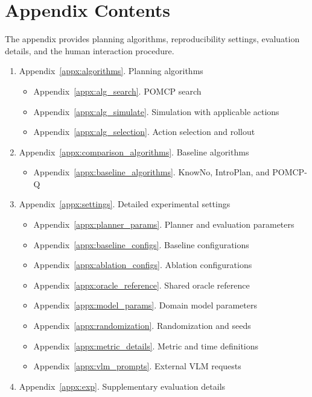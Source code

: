 \onecolumn
\setcounter{secnumdepth}{3}
\section*{Appendix Contents}
The appendix provides planning algorithms, reproducibility settings, evaluation details, and the human interaction procedure.

\begin{enumerate}
  \item Appendix~\ref{appx:algorithms}. Planning algorithms
  \begin{itemize}
    \item Appendix~\ref{appx:alg_search}. POMCP search
    \item Appendix~\ref{appx:alg_simulate}. Simulation with applicable actions
    \item Appendix~\ref{appx:alg_selection}. Action selection and rollout
  \end{itemize}
  \item Appendix~\ref{appx:comparison_algorithms}. Baseline algorithms
  \begin{itemize}
    \item Appendix~\ref{appx:baseline_algorithms}. KnowNo, IntroPlan, and POMCP-Q
  \end{itemize}
  \item Appendix~\ref{appx:settings}. Detailed experimental settings
  \begin{itemize}
    \item Appendix~\ref{appx:planner_params}. Planner and evaluation parameters
    \item Appendix~\ref{appx:baseline_configs}. Baseline configurations
    \item Appendix~\ref{appx:ablation_configs}. Ablation configurations
    \item Appendix~\ref{appx:oracle_reference}. Shared oracle reference
    \item Appendix~\ref{appx:model_params}. Domain model parameters
    \item Appendix~\ref{appx:randomization}. Randomization and seeds
    \item Appendix~\ref{appx:metric_details}. Metric and time definitions
    \item Appendix~\ref{appx:vlm_prompts}. External VLM requests
  \end{itemize}
  \item Appendix~\ref{appx:exp}. Supplementary evaluation details
  \begin{itemize}

\end{itemize}
\end{enumerate}
